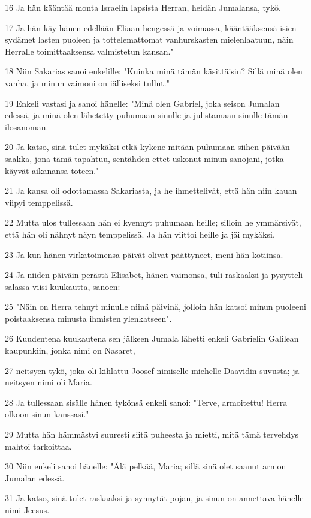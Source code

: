 \par 16 Ja hän kääntää monta Israelin lapsista Herran, heidän Jumalansa, tykö.
\par 17 Ja hän käy hänen edellään Eliaan hengessä ja voimassa, kääntääksensä isien sydämet lasten puoleen ja tottelemattomat vanhurskasten mielenlaatuun, näin Herralle toimittaaksensa valmistetun kansan."
\par 18 Niin Sakarias sanoi enkelille: "Kuinka minä tämän käsittäisin? Sillä minä olen vanha, ja minun vaimoni on iälliseksi tullut."
\par 19 Enkeli vastasi ja sanoi hänelle: "Minä olen Gabriel, joka seison Jumalan edessä, ja minä olen lähetetty puhumaan sinulle ja julistamaan sinulle tämän ilosanoman.
\par 20 Ja katso, sinä tulet mykäksi etkä kykene mitään puhumaan siihen päivään saakka, jona tämä tapahtuu, sentähden ettet uskonut minun sanojani, jotka käyvät aikanansa toteen."
\par 21 Ja kansa oli odottamassa Sakariasta, ja he ihmettelivät, että hän niin kauan viipyi temppelissä.
\par 22 Mutta ulos tullessaan hän ei kyennyt puhumaan heille; silloin he ymmärsivät, että hän oli nähnyt näyn temppelissä. Ja hän viittoi heille ja jäi mykäksi.
\par 23 Ja kun hänen virkatoimensa päivät olivat päättyneet, meni hän kotiinsa.
\par 24 Ja niiden päiväin perästä Elisabet, hänen vaimonsa, tuli raskaaksi ja pysytteli salassa viisi kuukautta, sanoen:
\par 25 "Näin on Herra tehnyt minulle niinä päivinä, jolloin hän katsoi minun puoleeni poistaaksensa minusta ihmisten ylenkatseen".
\par 26 Kuudentena kuukautena sen jälkeen Jumala lähetti enkeli Gabrielin Galilean kaupunkiin, jonka nimi on Nasaret,
\par 27 neitsyen tykö, joka oli kihlattu Joosef nimiselle miehelle Daavidin suvusta; ja neitsyen nimi oli Maria.
\par 28 Ja tullessaan sisälle hänen tykönsä enkeli sanoi: "Terve, armoitettu! Herra olkoon sinun kanssasi."
\par 29 Mutta hän hämmästyi suuresti siitä puheesta ja mietti, mitä tämä tervehdys mahtoi tarkoittaa.
\par 30 Niin enkeli sanoi hänelle: "Älä pelkää, Maria; sillä sinä olet saanut armon Jumalan edessä.
\par 31 Ja katso, sinä tulet raskaaksi ja synnytät pojan, ja sinun on annettava hänelle nimi Jeesus.
